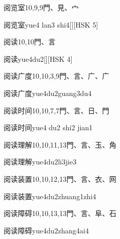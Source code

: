 \begin{Entry}{阅览室}{10,9,9}{⾨、⾒、⼧}
  \begin{Phonetics}{阅览室}{yue4 lan3 shi4}[][HSK 5]
  \end{Phonetics}
\end{Entry}

\begin{Entry}{阅读}{10,10}{⾨、⾔}
  \begin{Phonetics}{阅读}{yue4du2}[][HSK 4]
  \end{Phonetics}
\end{Entry}

\begin{Entry}{阅读广度}{10,10,3,9}{⾨、⾔、⼴、⼴}
  \begin{Phonetics}{阅读广度}{yue4du2guang3du4}
  \end{Phonetics}
\end{Entry}

\begin{Entry}{阅读时间}{10,10,7,7}{⾨、⾔、⽇、⾨}
  \begin{Phonetics}{阅读时间}{yue4 du2 shi2 jian1}
  \end{Phonetics}
\end{Entry}

\begin{Entry}{阅读理解}{10,10,11,13}{⾨、⾔、⽟、⾓}
  \begin{Phonetics}{阅读理解}{yue4du2li3jie3}
  \end{Phonetics}
\end{Entry}

\begin{Entry}{阅读装置}{10,10,12,13}{⾨、⾔、⾐、⽹}
  \begin{Phonetics}{阅读装置}{yue4du2zhuang1zhi4}
  \end{Phonetics}
\end{Entry}

\begin{Entry}{阅读障碍}{10,10,13,13}{⾨、⾔、⾩、⽯}
  \begin{Phonetics}{阅读障碍}{yue4du2zhang4ai4}
  \end{Phonetics}
\end{Entry}

